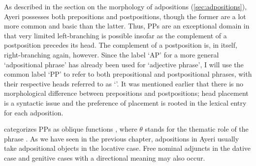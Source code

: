 As described in the section on the morphology of adpositions
(\autoref{sec:adpositions}), Ayeri possesses both prepositions and
postpositions, though the former are a lot more common and basic than the
latter. Thus, PPs are an exceptional domain in that very limited left-branching
is possible insofar as the complement of a postposition precedes its head. The
complement of a postposition is, in itself, right-branching again, however.
Since the label `AP' for a more general `adpositional phrase' has already been
used for `adjective phrase', I will use the common label `PP' to refer to both
prepositional and postpositional phrases, with their respective heads referred
to as `'. It was mentioned earlier that there is no morphological
difference between prepositions and postpositions; head placement is a
syntactic issue and the preference of placement is rooted in the lexical entry
for each adposition.

\Lfg{} categorizes PPs as oblique functions 
\Oblique{}, where $\theta$ stands for the thematic role of the phrase
\citep[9--10]{dalrymple2001}. As we have seen in the previous chapter,
adpositions in Ayeri usually take adpositional objects in the locative case.
Free nominal adjuncts in the dative case and genitive cases
with a directional meaning may also occur.

